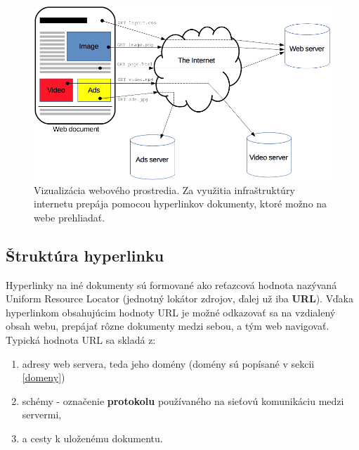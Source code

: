 \begin{figure}[htb]
\begin{center}
 \includegraphics[scale=0.55]{obrazky-figures/fetching_a_page.png}
 \caption{\centering Vizualizácia webového prostredia. Za využitia infraštruktúry internetu prepája pomocou hyperlinkov dokumenty, ktoré možno na webe prehliadať.}
 \label{img:fetching-a-page}
\end{center}
\end{figure}


\pagebreak

\subsection{Štruktúra hyperlinku}
\label{navigacia-na-webe}

Hyperlinky na iné dokumenty sú formované ako reťazcová hodnota nazývaná Uniform Resource Locator (jednotný lokátor zdrojov, ďalej už iba \textbf{URL}).
Vďaka hyperlinkom obsahujúcim hodnoty URL je možné odkazovať sa na vzdialený obsah webu, prepájať rôzne dokumenty medzi sebou, a tým web navigovať.
Typická hodnota URL sa skladá z:
\begin{enumerate}
    \item adresy web servera, teda jeho domény (domény sú popísané v sekcii \ref{domeny})
    
    \item schémy - označenie \textbf{protokolu} používaného na sieťovú komunikáciu medzi servermi,
    
    \item a cesty k uloženému dokumentu.
\end{enumerate}

